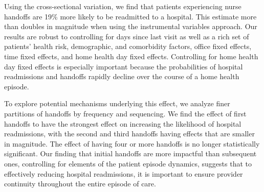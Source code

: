 \documentclass[final,12pt, notitlepage]{article}
\begin{document}
Using the cross-sectional variation,
we find that patients experiencing nurse handoffs are 19\% more likely to be readmitted to a hospital.
This estimate more than doubles in magnitude when using the instrumental variables approach.
Our results are robust to controlling for days since last visit as well as a rich set of patients' health risk, demographic, and comorbidity factors, office fixed effects, time fixed effects, and home health day fixed effects.
Controlling for home health day fixed effects is especially important because the probabilities of hospital readmissions and handoffs rapidly decline over the course of a home health episode.

To explore potential mechanisms underlying this effect, we analyze finer partitions of handoffs by frequency and sequencing.
We find the effect of first handoffs to have the strongest effect on increasing the likelihood of hospital readmissions, with the second and third handoffs having effects that are smaller in magnitude.
The effect of having four or more handoffs is no longer statistically significant.
Our finding that initial handoffs are more impactful than subsequent ones, controlling for elements of the patient episode dynamics, suggests that to effectively reducing hospital readmissions, it is important to ensure provider continuity throughout the entire episode of care.
\end{document}
